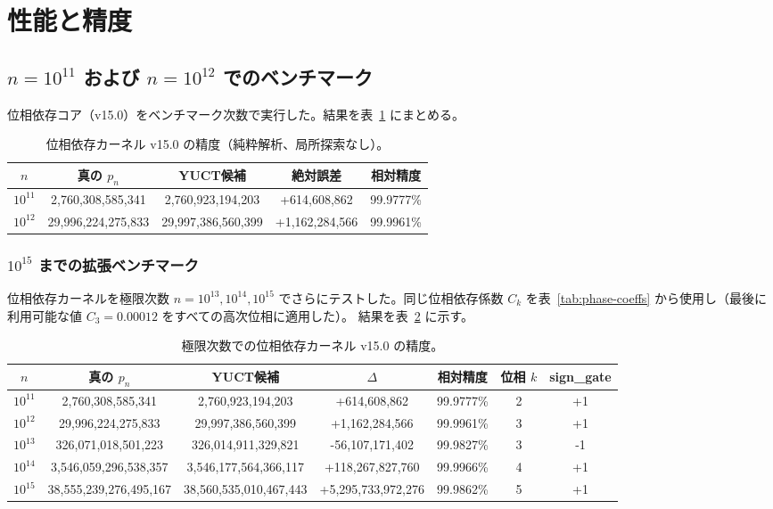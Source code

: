 \documentclass[11pt,a4paper]{article}
\begin{document}
	\section{性能と精度}
	\label{sec:performance}
	\subsection{\(n=10^{11}\) および \(n=10^{12}\) でのベンチマーク}
	位相依存コア（v15.0）をベンチマーク次数で実行した。結果を表~\ref{tab:benchmark-v15} にまとめる。
	
	\begin{table}[htbp]
		\centering
		\caption{位相依存カーネル v15.0 の精度（純粋解析、局所探索なし）。}
		\label{tab:benchmark-v15}
		\begin{tabular}{c c c c c}
			\toprule
			\(n\) & 真の \(p_n\) & YUCT候補 & 絶対誤差 & 相対精度 \\
			\midrule
			\(10^{11}\) & 2,760,308,585,341 & 2,760,923,194,203 & +614,608,862 & 99.9777\% \\
			\(10^{12}\) & 29,996,224,275,833 & 29,997,386,560,399 & +1,162,284,566 & 99.9961\% \\
			\bottomrule
		\end{tabular}
	\end{table}
	
	\subsubsection{\(10^{15}\) までの拡張ベンチマーク}
	
	位相依存カーネルを極限次数
	\(n = 10^{13}, 10^{14}, 10^{15}\) でさらにテストした。同じ位相依存係数
	\(C_k\) を表~\ref{tab:phase-coeffs} から使用し（最後に利用可能な値
	\(C_3 = 0.00012\) をすべての高次位相に適用した）。
	結果を表~\ref{tab:benchmark-extreme} に示す。
	
	\begin{table}[htbp]
		\centering
		\scriptsize
		\caption{極限次数での位相依存カーネル v15.0 の精度。}
		\label{tab:benchmark-extreme}
		\begin{tabular}{c c c c c c c}
			\toprule
			\(n\) & 真の \(p_n\) & YUCT候補 & \(\Delta\) & 相対精度 & 位相 \(k\) & sign\_gate \\
			\midrule
			\(10^{11}\) & 2,760,308,585,341 & 2,760,923,194,203 & +614,608,862   & 99.9777\% & 2 & +1 \\
			\(10^{12}\) & 29,996,224,275,833 & 29,997,386,560,399 & +1,162,284,566 & 99.9961\% & 3 & +1 \\
			\(10^{13}\) & 326,071,018,501,223 & 326,014,911,329,821 & -56,107,171,402 & 99.9827\% & 3 & -1 \\
			\(10^{14}\) & 3,546,059,296,538,357 & 3,546,177,564,366,117 & +118,267,827,760 & 99.9966\% & 4 & +1 \\
			\(10^{15}\) & 38,555,239,276,495,167 & 38,560,535,010,467,443 & +5,295,733,972,276 & 99.9862\% & 5 & +1 \\
			\bottomrule
		\end{tabular}
	\end{table}
	
\end{document}
